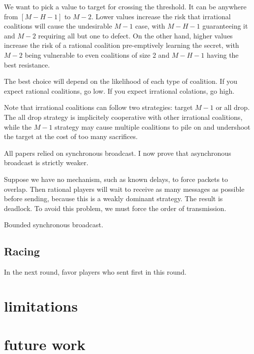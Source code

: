 \documentclass{article}
\begin{document}
We want to pick a value to target for crossing the threshold. It can be anywhere from $[M-H-1]$ to $M - 2$. Lower values increase the risk that irrational coalitions will cause the undesirable $M-1$ case, with $M-H-1$ guaranteeing it and $M-2$ requiring all but one to defect. On the other hand, higher values increase the risk of a rational coalition pre-emptively learning the secret, with $M-2$ being vulnerable to even coalitions of size 2 and $M-H-1$ having the best resistance.

The best choice will depend on the likelihood of each type of coalition. If you expect rational coalitions, go low. If you expect irrational colations, go high.

Note that irrational coalitions can follow two strategies: target $M-1$ or all drop. The all drop strategy is implicitely cooperative with other irrational coalitions, while the $M-1$ strategy may cause multiple coalitions to pile on and undershoot the target at the cost of too many sacrifices.

All papers relied on synchronous broadcast. I now prove that asynchronous broadcast is strictly weaker.

Suppose we have no mechanism, such as known delays, to force packets to overlap. Then rational players will wait to receive as many messages as possible before sending, because this is a weakly dominant strategy. The result is deadlock. To avoid this problem, we must force the order of transmission.

Bounded synchronous broadcast.

\subsection{Racing}
In the next round, favor players who sent first in this round.

\section{limitations}
\section{future work}
\end{document}

